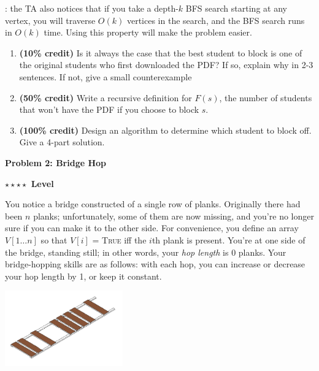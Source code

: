 \documentclass{article}\usepackage[utf8]{inputenc}\usepackage[margin=0.4cm,top=0.4cm,bottom=0.4cm]{geometry}
\begin{document}
\vspace{2pt}
: the TA also notices that if you take a depth-$k$ BFS search starting at any vertex, you will
traverse $O(k)$ vertices in the search, and the BFS search runs in $O(k)$ time. Using this property will make
the problem easier.
\begin{enumerate}
\item {\bf (10\% credit)} Is it always the case that the best student to block is one of the original students who first
downloaded the PDF? If so, explain why in 2-3 sentences. If not, give a small counterexample
\BeginSolution %

\EndSolution
\item {\bf(50\% credit)} Write a recursive definition for $F(s)$, the number of students that won't have the PDF if
you choose to block $s$.
\BeginSolution %

\EndSolution
\item {\bf(100\% credit)} Design an algorithm to determine which student to block off. Give a 4-part solution.
\BeginSolution %

\EndSolution
\end{enumerate}
\clearpage

\vspace{-2mm}\noindent\begin{mybox}{\begin{center}\textbf{\color{black}Problem 2: Bridge Hop}\end{center}}\end{mybox}\vspace{-2mm}
\begin{myboxot}\noindent\textbf{$\star\star\star\star$ Level}\end{myboxot} 

\noindent You notice a bridge constructed of a single row of planks. Originally there had been $n$ planks; unfortunately,
some of them are now missing, and you're no longer sure if you can make it to the other side. For convenience, you define an array $V[1\ldots n]$ so that $V[i]$ = \textsc{True} iff the $i$th plank is present. You're at one side of the bridge, standing still; in other words, your {\it hop length} is 0 planks. Your bridge-hopping skills are as follows: with each hop, you can increase or decrease your hop length by 1, or keep it constant.

\hspace*{-0.5cm} \includegraphics[width=2in]{bridge}
\end{document}
